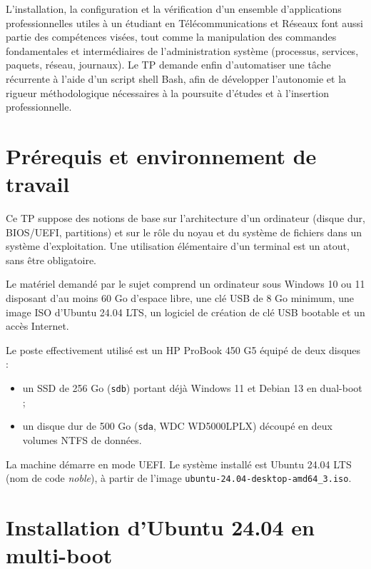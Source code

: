 \documentclass[11pt,a4paper]{article}
\begin{document}
L'installation, la configuration et la v\'erification d'un ensemble d'applications professionnelles utiles \`a un
\'etudiant en T\'el\'ecommunications et R\'eseaux font aussi partie des comp\'etences vis\'ees, tout comme la
manipulation des commandes fondamentales et interm\'ediaires de l'administration syst\`eme (processus,
services, paquets, r\'eseau, journaux). Le TP demande enfin d'automatiser une t\^ache r\'ecurrente \`a l'aide
d'un script shell Bash, afin de d\'evelopper l'autonomie et la rigueur m\'ethodologique n\'ecessaires \`a la
poursuite d'\'etudes et \`a l'insertion professionnelle.

\section{Pr\'erequis et environnement de travail}

Ce TP suppose des notions de base sur l'architecture d'un ordinateur (disque dur, BIOS/UEFI,
partitions) et sur le r\^ole du noyau et du syst\`eme de fichiers dans un syst\`eme d'exploitation. Une
utilisation \'el\'ementaire d'un terminal est un atout, sans \^etre obligatoire.

Le mat\'eriel demand\'e par le sujet comprend un ordinateur sous Windows 10 ou 11 disposant d'au moins
60 Go d'espace libre, une cl\'e USB de 8 Go minimum, une image ISO d'Ubuntu 24.04 LTS, un logiciel de
cr\'eation de cl\'e USB bootable et un acc\`es Internet.

Le poste effectivement utilis\'e est un HP ProBook 450 G5 \'equip\'e de deux disques :

\begin{itemize}[noitemsep]
    \item un SSD de 256 Go (\texttt{sdb}) portant d\'ej\`a Windows 11 et Debian 13 en dual-boot ;
    \item un disque dur de 500 Go (\texttt{sda}, WDC WD5000LPLX) d\'ecoup\'e en deux volumes NTFS de donn\'ees.
\end{itemize}

La machine d\'emarre en mode UEFI. Le syst\`eme install\'e est Ubuntu 24.04 LTS (nom de code \emph{noble}),
\`a partir de l'image \texttt{ubuntu-24.04-desktop-amd64\_3.iso}.

\section{Installation d'Ubuntu 24.04 en multi-boot}
\end{document}
